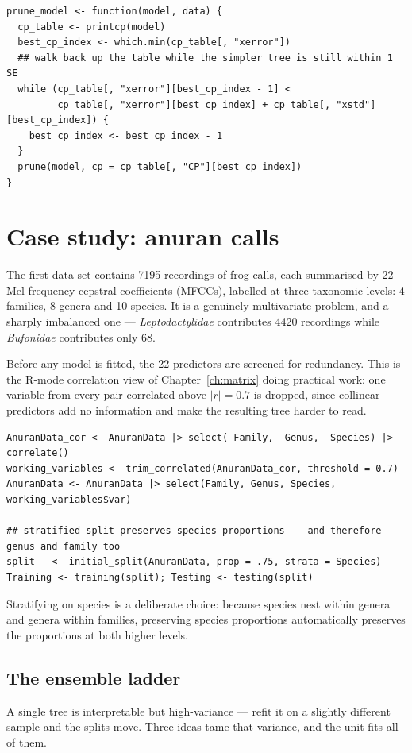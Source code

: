 \documentclass[11pt,oneside]{book}
\begin{document}
\begin{lstlisting}
prune_model <- function(model, data) {
  cp_table <- printcp(model)
  best_cp_index <- which.min(cp_table[, "xerror"])
  ## walk back up the table while the simpler tree is still within 1 SE
  while (cp_table[, "xerror"][best_cp_index - 1] <
         cp_table[, "xerror"][best_cp_index] + cp_table[, "xstd"][best_cp_index]) {
    best_cp_index <- best_cp_index - 1
  }
  prune(model, cp = cp_table[, "CP"][best_cp_index])
}
\end{lstlisting}

\section{Case study: anuran calls}
The first data set contains 7195 recordings of frog calls, each summarised by 22
Mel-frequency cepstral coefficients (MFCCs), labelled at three taxonomic levels: 4
families, 8 genera and 10 species. It is a genuinely multivariate problem, and a sharply
imbalanced one — \emph{Leptodactylidae} contributes 4420 recordings while
\emph{Bufonidae} contributes only 68.

Before any model is fitted, the 22 predictors are screened for redundancy. This is the
R-mode correlation view of Chapter~\ref{ch:matrix} doing practical work: one variable from every pair
correlated above $|r|=0.7$ is dropped, since collinear predictors add no information and
make the resulting tree harder to read.

\begin{lstlisting}
AnuranData_cor <- AnuranData |> select(-Family, -Genus, -Species) |> correlate()
working_variables <- trim_correlated(AnuranData_cor, threshold = 0.7)
AnuranData <- AnuranData |> select(Family, Genus, Species, working_variables$var)

## stratified split preserves species proportions -- and therefore genus and family too
split   <- initial_split(AnuranData, prop = .75, strata = Species)
Training <- training(split); Testing <- testing(split)
\end{lstlisting}

Stratifying on species is a deliberate choice: because species nest within genera and
genera within families, preserving species proportions automatically preserves the
proportions at both higher levels.

\subsection{The ensemble ladder}
A single tree is interpretable but high-variance — refit it on a slightly different
sample and the splits move. Three ideas tame that variance, and the unit fits all of them.
\end{document}
